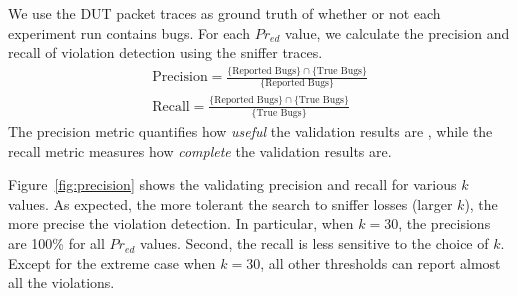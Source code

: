 We use the DUT packet traces as ground truth of whether or not each experiment
run contains bugs.
%
For each $Pr_{ed}$ value, we calculate the precision and recall of violation
detection using the sniffer traces.
%
\begin{align}
  \text{Precision} = \frac{\{\text{Reported Bugs}\} \cap \{\text{True Bugs}\}}{\{\text{Reported Bugs}\}}\\
  \text{Recall} = \frac{\{\text{Reported Bugs}\} \cap \{\text{True Bugs}\}}{\{\text{True Bugs}\}}
\end{align}
%
The precision metric quantifies how \textit{useful} the validation results are ,
while the recall metric measures how \textit{complete} the validation results
are.


Figure~\ref{fig:precision} shows the validating precision and recall for various
$k$ values.
%
As expected, the more tolerant the search to sniffer
losses (larger $k$), the more precise the violation detection.
%
In particular,
when $k=30$, the precisions are 100\% for all $Pr_{ed}$ values.
%
Second, the recall is less sensitive to the choice of $k$.
%
Except for the extreme case when $k=30$, all other thresholds can report almost
all the violations.
